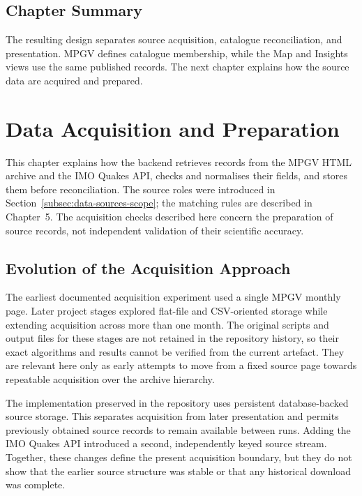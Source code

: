 \documentclass[12pt]{article}
\begin{document}
\subsection{Chapter Summary}
\label{subsec:project-overview-summary}

The resulting design separates source acquisition, catalogue reconciliation, and presentation. MPGV defines catalogue membership, while the Map and Insights views use the same published records. The next chapter explains how the source data are acquired and prepared.

\newpage


\section{Data Acquisition and Preparation}
\label{sec:data-acquisition-preparation}

\label{subsec:acquisition-scope}

This chapter explains how the backend retrieves records from the MPGV HTML archive and the IMO Quakes API, checks and normalises their fields, and stores them before reconciliation. The source roles were introduced in Section~\ref{subsec:data-sources-scope}; the matching rules are described in Chapter~5. The acquisition checks described here concern the preparation of source records, not independent validation of their scientific accuracy.

\subsection{Evolution of the Acquisition Approach}
\label{subsec:acquisition-evolution}

The earliest documented acquisition experiment used a single MPGV monthly page. Later project stages explored flat-file and CSV-oriented storage while extending acquisition across more than one month. The original scripts and output files for these stages are not retained in the repository history, so their exact algorithms and results cannot be verified from the current artefact. They are relevant here only as early attempts to move from a fixed source page towards repeatable acquisition over the archive hierarchy.

The implementation preserved in the repository uses persistent database-backed source storage. This separates acquisition from later presentation and permits previously obtained source records to remain available between runs. Adding the IMO Quakes API introduced a second, independently keyed source stream. Together, these changes define the present acquisition boundary, but they do not show that the earlier source structure was stable or that any historical download was complete.
\end{document}

